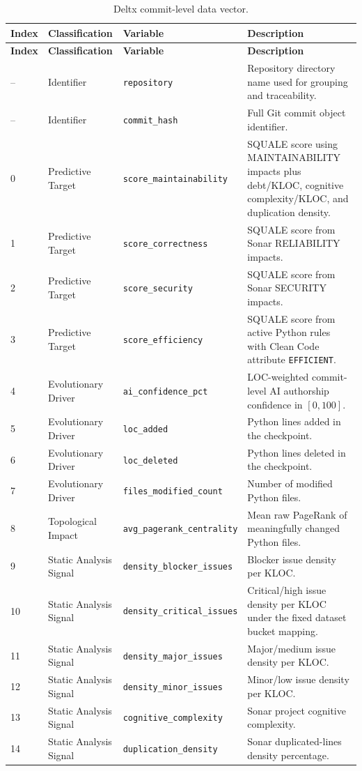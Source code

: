 \documentclass[12pt,a4paper,oneside]{report}
\newcommand{\code}[1]{\nolinkurl{#1}}
\begin{document}
\small
\begin{longtable}{@{}P{0.08\textwidth}P{0.20\textwidth}P{0.28\textwidth}P{\tabcolsep\relax}@{}}
\caption{Deltx commit-level data vector.}\label{tab:vector}\\
\toprule
\textbf{Index} & \textbf{Classification} & \textbf{Variable} & \textbf{Description} \\
\midrule
\endfirsthead
\toprule
\textbf{Index} & \textbf{Classification} & \textbf{Variable} & \textbf{Description} \\
\midrule
\endhead
-- & Identifier & \code{repository} & Repository directory name used for grouping and traceability. \\
-- & Identifier & \code{commit\_hash} & Full Git commit object identifier. \\
0 & Predictive Target & \code{score\_maintainability} & SQUALE score using MAINTAINABILITY impacts plus debt/KLOC, cognitive complexity/KLOC, and duplication density. \\
1 & Predictive Target & \code{score\_correctness} & SQUALE score from Sonar RELIABILITY impacts. \\
2 & Predictive Target & \code{score\_security} & SQUALE score from Sonar SECURITY impacts. \\
3 & Predictive Target & \code{score\_efficiency} & SQUALE score from active Python rules with Clean Code attribute \code{EFFICIENT}. \\
4 & Evolutionary Driver & \code{ai\_confidence\_pct} & LOC-weighted commit-level AI authorship confidence in $[0,100]$. \\
5 & Evolutionary Driver & \code{loc\_added} & Python lines added in the checkpoint. \\
6 & Evolutionary Driver & \code{loc\_deleted} & Python lines deleted in the checkpoint. \\
7 & Evolutionary Driver & \code{files\_modified\_count} & Number of modified Python files. \\
8 & Topological Impact & \code{avg\_pagerank\_centrality} & Mean raw PageRank of meaningfully changed Python files. \\
9 & Static Analysis Signal & \code{density\_blocker\_issues} & Blocker issue density per KLOC. \\
10 & Static Analysis Signal & \code{density\_critical\_issues} & Critical/high issue density per KLOC under the fixed dataset bucket mapping. \\
11 & Static Analysis Signal & \code{density\_major\_issues} & Major/medium issue density per KLOC. \\
12 & Static Analysis Signal & \code{density\_minor\_issues} & Minor/low issue density per KLOC. \\
13 & Static Analysis Signal & \code{cognitive\_complexity} & Sonar project cognitive complexity. \\
14 & Static Analysis Signal & \code{duplication\_density} & Sonar duplicated-lines density percentage. \\
\bottomrule
\end{longtable}
\normalsize
\end{document}
